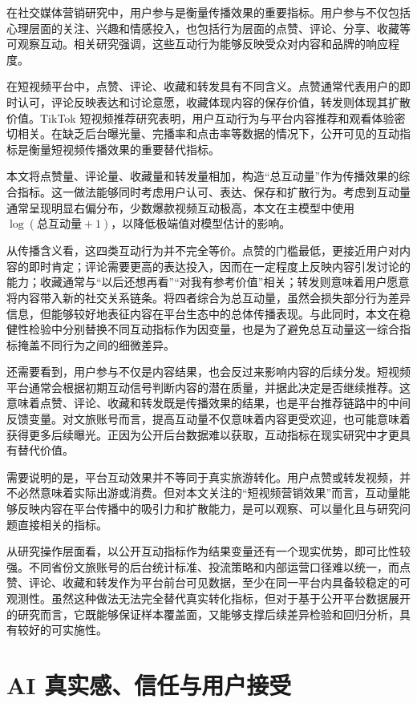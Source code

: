 在社交媒体营销研究中，用户参与是衡量传播效果的重要指标。用户参与不仅包括心理层面的关注、兴趣和情感投入，也包括行为层面的点赞、评论、分享、收藏等可观察互动\cite{lit11}。相关研究强调，这些互动行为能够反映受众对内容和品牌的响应程度\cite{lit12}。

在短视频平台中，点赞、评论、收藏和转发具有不同含义。点赞通常代表用户的即时认可，评论反映表达和讨论意愿，收藏体现内容的保存价值，转发则体现其扩散价值。TikTok 短视频推荐研究表明，用户互动行为与平台内容推荐和观看体验密切相关\cite{lit21}。在缺乏后台曝光量、完播率和点击率等数据的情况下，公开可见的互动指标是衡量短视频传播效果的重要替代指标。

本文将点赞量、评论量、收藏量和转发量相加，构造“总互动量”作为传播效果的综合指标。这一做法能够同时考虑用户认可、表达、保存和扩散行为。考虑到互动量通常呈现明显右偏分布，少数爆款视频互动极高，本文在主模型中使用 $\log(\text{总互动量}+1)$，以降低极端值对模型估计的影响。

从传播含义看，这四类互动行为并不完全等价。点赞的门槛最低，更接近用户对内容的即时肯定；评论需要更高的表达投入，因而在一定程度上反映内容引发讨论的能力；收藏通常与“以后还想再看”“对我有参考价值”相关；转发则意味着用户愿意将内容带入新的社交关系链条。将四者综合为总互动量，虽然会损失部分行为差异信息，但能够较好地表征内容在平台生态中的总体传播表现。与此同时，本文在稳健性检验中分别替换不同互动指标作为因变量，也是为了避免总互动量这一综合指标掩盖不同行为之间的细微差异。

还需要看到，用户参与不仅是内容结果，也会反过来影响内容的后续分发。短视频平台通常会根据初期互动信号判断内容的潜在质量，并据此决定是否继续推荐。这意味着点赞、评论、收藏和转发既是传播效果的结果，也是平台推荐链路中的中间反馈变量。对文旅账号而言，提高互动量不仅意味着内容更受欢迎，也可能意味着获得更多后续曝光。正因为公开后台数据难以获取，互动指标在现实研究中才更具有替代价值。

需要说明的是，平台互动效果并不等同于真实旅游转化。用户点赞或转发视频，并不必然意味着实际出游或消费。但对本文关注的“短视频营销效果”而言，互动量能够反映内容在平台传播中的吸引力和扩散能力，是可以观察、可以量化且与研究问题直接相关的指标。

从研究操作层面看，以公开互动指标作为结果变量还有一个现实优势，即可比性较强。不同省份文旅账号的后台统计标准、投流策略和内部运营口径难以统一，而点赞、评论、收藏和转发作为平台前台可见数据，至少在同一平台内具备较稳定的可观测性。虽然这种做法无法完全替代真实转化指标，但对于基于公开平台数据展开的研究而言，它既能够保证样本覆盖面，又能够支撑后续差异检验和回归分析，具有较好的可实施性。

\section{AI 真实感、信任与用户接受}

